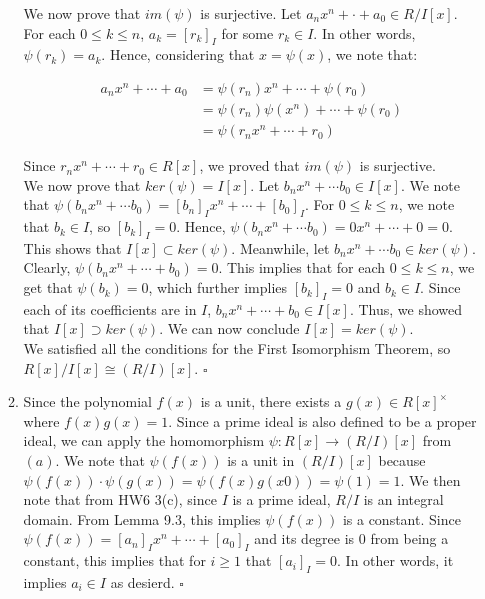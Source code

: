 \documentclass{article}
\begin{document}
\begin{enumerate}
\begin{enumerate}
    We now prove that $im(\psi)$ is surjective. Let $a_nx^n + \cdot + a_0 \in R/I[x]$. For each $0 \leq k \leq n$, $a_k = [r_k]_I$ for some $r_k \in I$. In other words, $\psi(r_k) = a_k$. Hence, considering that $x = \psi(x)$, we note that: 

    \begin{align*}
        a_nx^n + \cdots + a_0 &= \psi(r_n)x^n + \cdots + \psi(r_0) \\
        &= \psi(r_n)\psi(x^n) + \cdots + \psi(r_0)\\
        &= \psi(r_nx^n + \cdots + r_0)
    \end{align*}

    Since $r_nx^n + \cdots + r_0 \in R[x]$, we proved that $im(\psi)$ is surjective. \\

    We now prove that $ker(\psi) = I[x]$. Let $b_nx^n + \cdots b_0 \in I[x]$. We note that $\psi(b_nx^n + \cdots b_0) = [b_n]_Ix^n + \cdots + [b_0]_I$. For $0 \leq k \leq n$, we note that $b_k \in I$, so $[b_k]_I = 0$. Hence, $\psi(b_nx^n + \cdots b_0) = 0x^n + \cdots + 0 = 0$. This shows that $I[x] \subset ker(\psi)$. Meanwhile, let $b_nx^n + \cdots b_0 \in ker(\psi)$. Clearly, $\psi(b_nx^n + \cdots + b_0) = 0$. This implies that for each $0 \leq k \leq n$, we get that $\psi(b_k) = 0$, which further implies $[b_k]_I = 0$ and $b_k \in I$. Since each of its coefficients are in $I$, $b_nx^n + \cdots + b_0 \in I[x]$. Thus, we showed that $I[x] \supset ker(\psi)$. We can now conclude $I[x] = ker(\psi)$. \\

    We satisfied all the conditions for the First Isomorphism Theorem, so $R[x]/I[x] \cong (R/I)[x]$. \hfill $\square$  \\

    \item 
    Since the polynomial $f(x)$ is a unit, there exists a $g(x) \in R[x]^{\times}$ where $f(x)g(x) = 1$. Since a prime ideal is also defined to be a proper ideal, we can apply the homomorphism $\psi:R[x] \rightarrow (R/I)[x]$ from $(a)$. We note that $\psi(f(x))$ is a unit in $(R/I)[x]$ because $\psi(f(x))\cdot \psi(g(x)) = \psi(f(x)g(x0)) = \psi(1) = 1$. We then note that from HW6 3(c), since $I$ is a prime ideal, $R/I$ is an integral domain. From Lemma 9.3, this implies $\psi(f(x))$ is a constant. Since $\psi(f(x)) = [a_n]_Ix^n + \cdots + [a_0]_I$ and its degree is 0 from being a constant, this implies that for $i \geq 1$ that $[a_i]_I = 0$. In other words, it implies $a_i \in I$ as desierd. \hfill $\square$  \\


\end{enumerate}
\end{enumerate}
\end{document}
